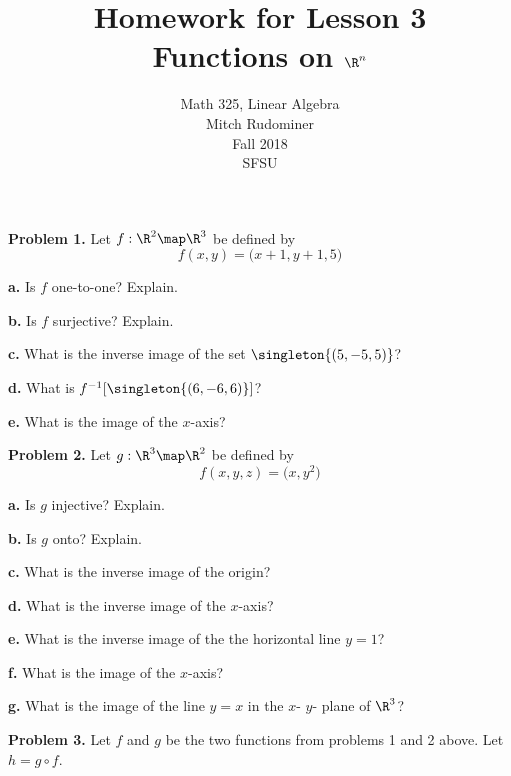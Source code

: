 \documentclass[oneside,12pt]{amsart}
\begin{document}
\title{Homework for Lesson 3 \\ Functions on $\R^n$}
\author{Math 325, Linear Algebra \\ Mitch Rudominer \\ Fall 2018 \\ SFSU }
\date{}

\maketitle


\textbf{Problem 1.} Let $f:\R^2\map\R^3$ be defined by
$$f(x,y) = \big(x+1, y+1,5 \big)$$

\textbf{a.} Is $f$ one-to-one? Explain.

\bigskip

\textbf{b.} Is $f$ surjective? Explain.

\bigskip

\textbf{c.} What is the inverse image of the set $\singleton{(5, -5, 5)}$?

\bigskip

\textbf{d.} What is $f^{-1}[\singleton{(6, -6, 6)}]$?

\bigskip

\textbf{e.} What is the image of the $x$-axis?

\bigskip

\textbf{Problem 2.} Let $g:\R^3\map\R^2$ be defined by
$$f(x,y,z) = \big(x, y^2 \big)$$

\textbf{a.} Is $g$ injective? Explain.

\bigskip

\textbf{b.} Is $g$ onto? Explain.

\bigskip

\textbf{c.} What is the inverse image of the origin?

\bigskip

\textbf{d.} What is the inverse image of the $x$-axis?

\bigskip

\textbf{e.} What is the inverse image of the the horizontal line $y=1$?

\bigskip

\textbf{f.} What is the image of the $x$-axis?

\bigskip

\textbf{g.} What is the image of the line $y=x$ in the $x$- $y$- plane
of $\R^3$?

\bigskip

\textbf{Problem 3.} Let $f$ and $g$ be the two functions from problems
1 and 2 above. Let $h = g \circ f$.
\end{document}
